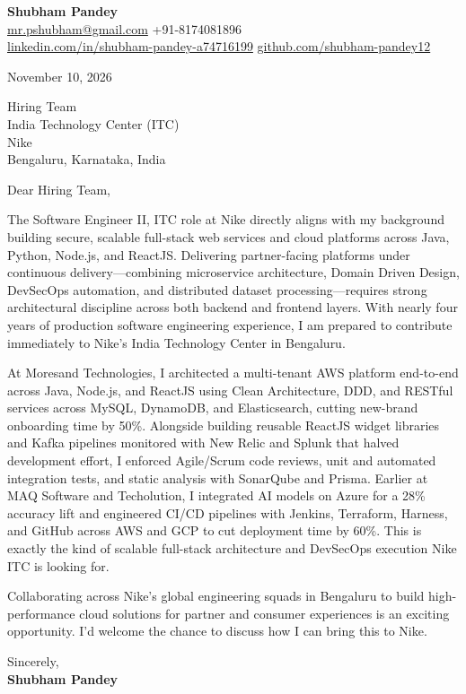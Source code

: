 \documentclass[a4paper,11pt]{article}
\begin{document}
\textbf{\Large Shubham Pandey}\\
\href{mailto:mr.pshubham@gmail.com}{mr.pshubham@gmail.com} \quad +91-8174081896\\
\href{https://www.linkedin.com/in/shubham-pandey-a74716199/}{linkedin.com/in/shubham-pandey-a74716199} \quad
\href{https://github.com/shubham-pandey12}{github.com/shubham-pandey12}

\vspace{1em}
November 10, 2026

\vspace{1em}
Hiring Team\\
India Technology Center (ITC)\\
Nike\\
Bengaluru, Karnataka, India

\vspace{1em}
Dear Hiring Team,

The Software Engineer II, ITC role at Nike directly aligns with my background building secure, scalable full-stack web services and cloud platforms across Java, Python, Node.js, and ReactJS. Delivering partner-facing platforms under continuous delivery---combining microservice architecture, Domain Driven Design, DevSecOps automation, and distributed dataset processing---requires strong architectural discipline across both backend and frontend layers. With nearly four years of production software engineering experience, I am prepared to contribute immediately to Nike's India Technology Center in Bengaluru.

At Moresand Technologies, I architected a multi-tenant AWS platform end-to-end across Java, Node.js, and ReactJS using Clean Architecture, DDD, and RESTful services across MySQL, DynamoDB, and Elasticsearch, cutting new-brand onboarding time by 50\%. Alongside building reusable ReactJS widget libraries and Kafka pipelines monitored with New Relic and Splunk that halved development effort, I enforced Agile/Scrum code reviews, unit and automated integration tests, and static analysis with SonarQube and Prisma. Earlier at MAQ Software and Techolution, I integrated AI models on Azure for a 28\% accuracy lift and engineered CI/CD pipelines with Jenkins, Terraform, Harness, and GitHub across AWS and GCP to cut deployment time by 60\%. This is exactly the kind of scalable full-stack architecture and DevSecOps execution Nike ITC is looking for.

Collaborating across Nike's global engineering squads in Bengaluru to build high-performance cloud solutions for partner and consumer experiences is an exciting opportunity. I'd welcome the chance to discuss how I can bring this to Nike.

\vspace{1em}
Sincerely,\\[0.5em]
\textbf{Shubham Pandey}
\end{document}
